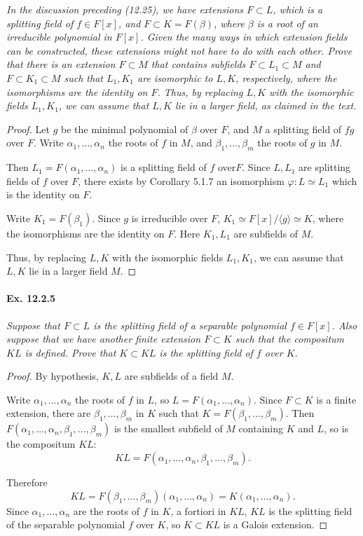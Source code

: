 \documentclass[11pt,a4paper]{article}
\begin{document}
{\it In the discussion preceding (12.25), we have extensions $F\subset L$, which is a splitting field of $f \in F[x]$, and $F \subset K = F(\beta)$, where $\beta$ is a root of an irreducible polynomial in $F[x]$. Given the many ways in which extension fields can be constructed, these extensions might not have to do with each other. Prove that there is an extension $F\subset M$ that contains subfields $F \subset L_1 \subset M$ and $F \subset K_1 \subset M$ such that $L_1,K_1$ are isomorphic to $L,K$, respectively, where the isomorphisms are the identity on $F$. Thus, by replacing $L,K$ with the isomorphic fields $L_1,K_1$, we can assume that $L,K$ lie in a larger field, as claimed in the text.
}

\begin{proof}
Let $g$ be the minimal polynomial of $\beta$ over $F$, and $M$ a splitting field of $fg$ over $F$. Write $\alpha_1,\ldots,\alpha_n$ the roots of $f$ in $M$, and $\beta_1,\ldots,\beta_m$ the roots of $g$ in $M$. 

Then $L_1 = F(\alpha_1,\ldots,\alpha_n)$ is a splitting field of $f$ over$ F$. Since $L,L_1$ are splitting fields of $f$ over $F$,  there exists by Corollary 5.1.7 an isomorphism $\varphi : L \simeq L_1$ which is the identity on $F$.

Write $K_1 = F(\beta_1)$. Since $g$ is irreducible over $F$, $K_1 \simeq F[x]/\langle g \rangle \simeq K$, where the isomorphisms are the identity on $F$. Here $K_1, L_1$ are subfields of $M$.

Thus, by replacing $L,K$ with the isomorphic fields $L_1,K_1$, we can assume that $L,K$ lie in a larger field $M$.
\end{proof}

\paragraph{Ex. 12.2.5}

{\it Suppose that $F\subset L$ is the splitting field of a separable polynomial $f\in F[x]$. Also suppose that we have another finite extension $F\subset K$ such that the compositum $KL$ is defined. Prove that $K\subset KL$ is the splitting field of $f$ over $K$.
}

\begin{proof}
By hypothesis, $K,L$ are subfields of a field $M$.

Write $\alpha_1,\ldots,\alpha_n$ the roots of $f$ in $L$, so $L = F(\alpha_1,\ldots,\alpha_n)$.
Since $F\subset K$ is a finite extension, there are $\beta_1,\ldots,\beta_m$ in $K$ such that $K = F(\beta_1,\ldots,\beta_m)$. Then $F(\alpha_1,\ldots,\alpha_n,\beta_1,\ldots,\beta_m)$ is the smallest subfield of $M$ containing $K$ and $L$, so is the compositum $KL$:
$$KL = F(\alpha_1,\ldots,\alpha_n,\beta_1,\ldots,\beta_m).$$

Therefore $$KL = F(\beta_1,\ldots,\beta_m)(\alpha_1,\ldots,\alpha_n) = K(\alpha_1,\ldots,\alpha_n).$$
Since $\alpha_1,\ldots,\alpha_n$ are the roots of $f$ in $K$, a fortiori in $KL$,  $KL$ is the splitting field of the separable polynomial $f$ over $ K$, so $K\subset KL$ is a Galois extension.
\end{proof}
\end{document}
